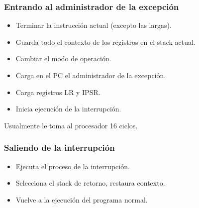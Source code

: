\documentclass[10.5pt,scale=1.0,t,aspectratio=169,hyperref={pdfpagelabels=false}]{beamer}
\begin{document}
\begin{frame}
	\frametitle{Entrando al administrador de la excepción}
	\begin{itemize}
		\item Terminar la instrucción actual (excepto las largas).
		\item Guarda todo el contexto de los registros en el stack actual.
		\item Cambiar el modo de operación.
		\item Carga en el PC el administrador de la excepción.
		\item Carga registros LR y IPSR.
		\item Inicia ejecución de la interrupción. 
	\end{itemize}
	Usualmente le toma al procesador 16 ciclos. 
\end{frame}
\begin{frame}
	\frametitle{Saliendo de la interrupción}
	\begin{itemize}
		\item Ejecuta el proceso de la interrupción.
		\item Selecciona el stack de retorno, restaura contexto.
		\item Vuelve a la ejecución del programa normal. 
	\end{itemize}
\end{frame}
\end{document}
